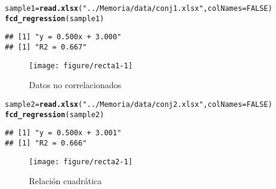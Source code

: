 \documentclass[12pt]{report}\usepackage[]{graphicx}\usepackage[dvipsnames]{xcolor}
\makeatletter
\def\maxwidth{ %
  \ifdim\Gin@nat@width>\linewidth
    \linewidth
  \else
    \Gin@nat@width
  \fi
}
\newcommand{\hlnum}[1]{\textcolor[rgb]{0.686,0.059,0.569}{#1}}%
\newcommand{\hlstr}[1]{\textcolor[rgb]{0.192,0.494,0.8}{#1}}%
\newcommand{\hlstd}[1]{\textcolor[rgb]{0.345,0.345,0.345}{#1}}%
\newcommand{\hlkwb}[1]{\textcolor[rgb]{0.69,0.353,0.396}{#1}}%
\newcommand{\hlkwc}[1]{\textcolor[rgb]{0.333,0.667,0.333}{#1}}%
\newcommand{\hlkwd}[1]{\textcolor[rgb]{0.737,0.353,0.396}{\textbf{#1}}}%
\newenvironment{kframe}{%
 \def\at@end@of@kframe{}%
 \ifinner\ifhmode%
  \def\at@end@of@kframe{\end{minipage}}%
  \begin{minipage}{\columnwidth}%
 \fi\fi%
 \def\FrameCommand##1{\hskip\@totalleftmargin \hskip-\fboxsep
 \colorbox{shadecolor}{##1}\hskip-\fboxsep
     \hskip-\linewidth \hskip-\@totalleftmargin \hskip\columnwidth}%
 \MakeFramed {\advance\hsize-\width
   \@totalleftmargin\z@ \linewidth\hsize
   \@setminipage}}%
 {\par\unskip\endMakeFramed%
 \at@end@of@kframe}
\newenvironment{knitrout}{}{} %
\makeatother
\begin{document}
\begin{knitrout}
\color{fgcolor}\begin{kframe}
\begin{alltt}
\hlstd{sample1} \hlkwb{=} \hlkwd{read.xlsx}\hlstd{(}\hlstr{"../Memoria/data/conj1.xlsx"}\hlstd{,} \hlkwc{colNames}\hlstd{=}\hlnum{FALSE}\hlstd{)}
\hlkwd{fcd_regression}\hlstd{(sample1)}
\end{alltt}
\begin{verbatim}
## [1] "y = 0.500x + 3.000"
## [1] "R2 = 0.667"
\end{verbatim}
\end{kframe}\begin{figure}

{\centering \texttt{[image: figure/recta1-1]} 

}

\caption[Datos no correlacionados]{Datos no correlacionados}\label{fig:recta1}
\end{figure}

\end{knitrout}
 				
\begin{knitrout}
\color{fgcolor}\begin{kframe}
\begin{alltt}
\hlstd{sample2} \hlkwb{=} \hlkwd{read.xlsx}\hlstd{(}\hlstr{"../Memoria/data/conj2.xlsx"}\hlstd{,} \hlkwc{colNames}\hlstd{=}\hlnum{FALSE}\hlstd{)}
\hlkwd{fcd_regression}\hlstd{(sample2)}
\end{alltt}
\begin{verbatim}
## [1] "y = 0.500x + 3.001"
## [1] "R2 = 0.666"
\end{verbatim}
\end{kframe}\begin{figure}

{\centering \texttt{[image: figure/recta2-1]} 

}

\caption[Relación cuadrática]{Relación cuadrática}\label{fig:recta2}
\end{figure}

\end{knitrout}
 				
\end{document}
